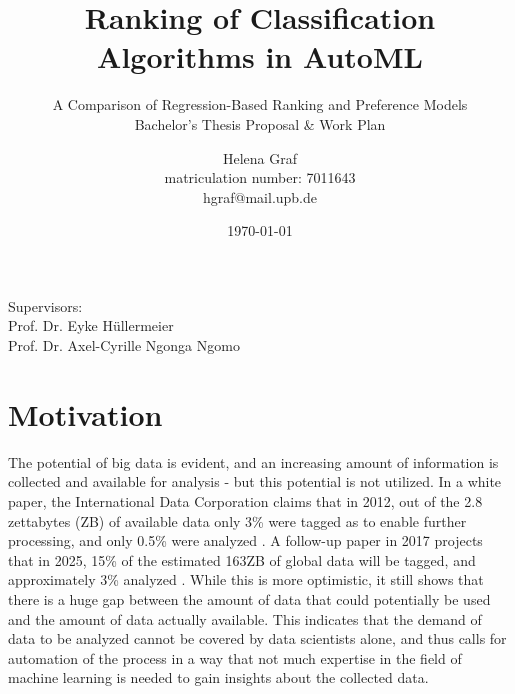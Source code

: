 \documentclass[12pt]{scrartcl}
\begin{document}
\title{Ranking of Classification Algorithms in AutoML}
\subtitle{A Comparison of Regression-Based Ranking and Preference Models
\\\vspace{2em}Bachelor's Thesis Proposal \& Work Plan}

\author{Helena Graf\\ 
\small{matriculation number: 7011643}\\ 
\small{hgraf@mail.upb.de}}
\date{\today}

\maketitle
\vspace{2em}

\begin{center}
\small{Supervisors:}\\
\large{Prof. Dr. Eyke H\"ullermeier}\\
\large{Prof. Dr. Axel-Cyrille Ngonga Ngomo}
\end{center}

\newpage


\section{Motivation}\label{sec:motivation}
The potential of big data is evident, and an increasing amount of information is collected and available for analysis - but this potential is not utilized. In a white paper, the International Data Corporation claims that in 2012, out of the 2.8 zettabytes (ZB) of available data only 3\% were tagged as to enable further processing, and only 0.5\% were analyzed \cite{gantz2012the}. A follow-up paper in 2017 projects that in 2025, 15\% of the estimated 163ZB of global data will be tagged, and approximately 3\% analyzed \cite{gantz2017data}. While this is more optimistic, it still shows that there is a huge gap between the amount of data that could potentially be used and the amount of data actually available. This indicates that the demand of data to be analyzed cannot be covered by data scientists alone, and thus calls for automation of the process in a way that not much expertise in the field of machine learning is needed to gain insights about the collected data.\\
\end{document}
